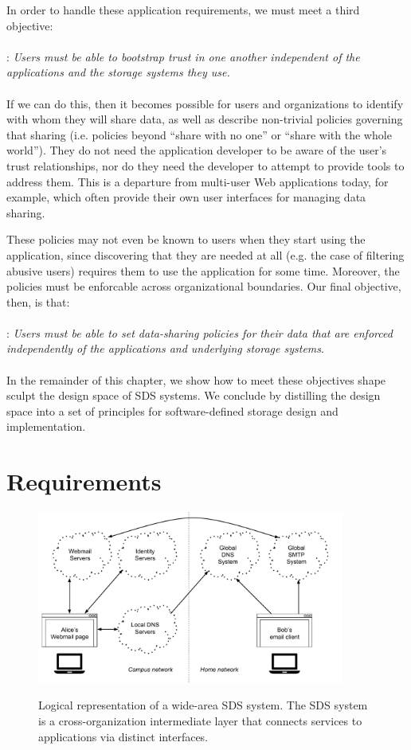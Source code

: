 In order to handle these application requirements, we must meet a third
objective:
\\
\\
: \emph{Users must be able to bootstrap trust in one another independent of the
applications and the storage systems they use.}
\\
\\
If we can do this, then it becomes possible for users and organizations to
identify with whom they will share data, as well as describe non-trivial
policies governing that sharing (i.e. policies beyond ``share with no one'' or ``share
with the whole world'').  They do not need the application developer to be aware
of the user's trust relationships, nor do they need the developer to attempt to
provide tools to address them.  This is a departure from multi-user Web
applications today, for example, which often provide their own user interfaces
for managing data sharing.

These policies may not even be known to users when they start using the application, since
discovering that they are needed at all (e.g. the case of filtering
abusive users) requires them to use the application for some time.  Moreover,
the policies must be enforcable across organizational boundaries.
Our final objective, then, is that:
\\
\\
: \emph{Users must be able to set data-sharing policies
for their data that are enforced independently of the applications and underlying storage
systems}.
\\
\\
In the remainder of this chapter, we show how to meet these objectives shape
sculpt the design space of SDS systems.  We
conclude by distilling the design space into a set of principles for
software-defined storage design and implementation.

\section{Requirements}

\begin{figure}[h]
   \caption{Logical representation of a wide-area SDS system.  The SDS system
   is a cross-organization intermediate layer that connects services to
   applications via distinct interfaces.}
   \centering
   \includegraphics[width=0.9\textwidth,page=2]{figures/dissertation-figures}
   \label{fig:chap2-sds-overview}
\end{figure}


